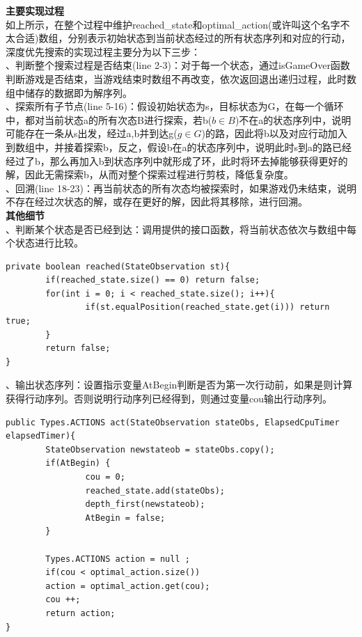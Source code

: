 \documentclass[UTF8]{article}
\begin{document}
\noindent\textbf{主要实现过程}\\
\indent 如上所示，在整个过程中维护reached\_state和optimal\_action(或许叫这个名字不太合适)数组，分别表示初始状态到当前状态经过的所有状态序列和对应的行动，深度优先搜索的实现过程主要分为以下三步：\\
、判断整个搜索过程是否结束(line 2-3)：对于每一个状态，通过isGameOver函数判断游戏是否结束，当游戏结束时数组不再改变，依次返回退出递归过程，此时数组中储存的数据即为解序列。\\
、探索所有子节点(line 5-16)：假设初始状态为s，目标状态为G，在每一个循环中，都对当前状态a的所有次态B进行探索，若b($b\in B$)不在a的状态序列中，说明可能存在一条从s出发，经过a,b并到达g($g\in G$)的路，因此将b以及对应行动加入到数组中，并接着探索b，反之，假设b在a的状态序列中，说明此时s到a的路已经经过了b，那么再加入b到状态序列中就形成了环，此时将环去掉能够获得更好的解，因此无需探索b，从而对整个探索过程进行剪枝，降低复杂度。\\
、回溯(line 18-23)：再当前状态的所有次态均被探索时，如果游戏仍未结束，说明不存在经过次状态的解，或存在更好的解，因此将其移除，进行回溯。\\

\noindent\textbf{其他细节}\\
、判断某个状态是否已经到达：调用提供的接口函数，将当前状态依次与数组中每个状态进行比较。
\begin{lstlisting}[caption=判断状态是否已经到达]
private boolean reached(StateObservation st){
		if(reached_state.size() == 0) return false;
		for(int i = 0; i < reached_state.size(); i++){
				if(st.equalPosition(reached_state.get(i))) return true;    
		}
		return false;
}
\end{lstlisting}

、输出状态序列：设置指示变量AtBegin判断是否为第一次行动前，如果是则计算获得行动序列。否则说明行动序列已经得到，则通过变量cou输出行动序列。

\begin{lstlisting}[caption=输出行动序列]
public Types.ACTIONS act(StateObservation stateObs, ElapsedCpuTimer elapsedTimer){
		StateObservation newstateob = stateObs.copy();
		if(AtBegin) {
				cou = 0;
				reached_state.add(stateObs);
				depth_first(newstateob);
				AtBegin = false;
		}
		
		Types.ACTIONS action = null ;
		if(cou < optimal_action.size())
		action = optimal_action.get(cou);
		cou ++;
		return action;
}
\end{lstlisting}
\end{document}
